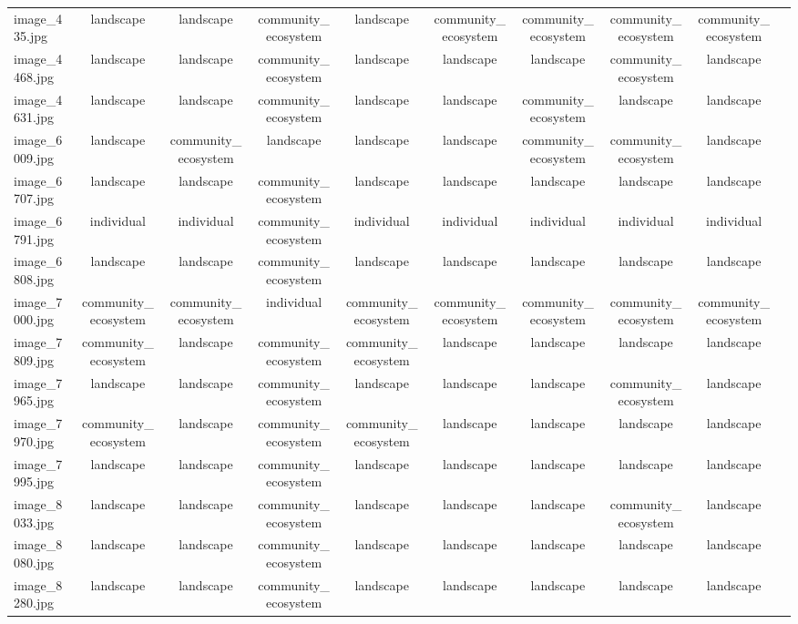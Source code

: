 \documentclass[hidelinks, 11pt]{article}
\begin{document}
\begin{longtable}{@{}lccccccccc@{}}
image\_435.jpg   & landscape & landscape & community\_ecosystem & landscape & community\_ecosystem & community\_ecosystem & community\_ecosystem & community\_ecosystem \\
image\_4468.jpg  & landscape & landscape & community\_ecosystem & landscape & landscape & landscape & community\_ecosystem & landscape \\
image\_4631.jpg  & landscape & landscape & community\_ecosystem & landscape & landscape & community\_ecosystem & landscape & landscape \\
image\_6009.jpg  & landscape & community\_ecosystem & landscape & landscape & landscape & community\_ecosystem & community\_ecosystem & landscape \\
image\_6707.jpg  & landscape & landscape & community\_ecosystem & landscape & landscape & landscape & landscape & landscape \\
image\_6791.jpg  & individual & individual & community\_ecosystem & individual & individual & individual & individual & individual \\
image\_6808.jpg  & landscape & landscape & community\_ecosystem & landscape & landscape & landscape & landscape & landscape \\
image\_7000.jpg  & community\_ecosystem & community\_ecosystem & individual & community\_ecosystem & community\_ecosystem & community\_ecosystem & community\_ecosystem & community\_ecosystem \\
image\_7809.jpg  & community\_ecosystem & landscape & community\_ecosystem & community\_ecosystem & landscape & landscape & landscape & landscape \\
image\_7965.jpg  & landscape & landscape & community\_ecosystem & landscape & landscape & landscape & community\_ecosystem & landscape \\
image\_7970.jpg  & community\_ecosystem & landscape & community\_ecosystem & community\_ecosystem & landscape & landscape & landscape & landscape \\
image\_7995.jpg  & landscape & landscape & community\_ecosystem & landscape & landscape & landscape & landscape & landscape \\
image\_8033.jpg  & landscape & landscape & community\_ecosystem & landscape & landscape & landscape & community\_ecosystem & landscape \\
image\_8080.jpg  & landscape & landscape & community\_ecosystem & landscape & landscape & landscape & landscape & landscape \\
image\_8280.jpg  & landscape & landscape & community\_ecosystem & landscape & landscape & landscape & landscape & landscape \\

\end{longtable}
\end{document}
